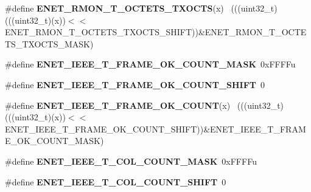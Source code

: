 \begin{DoxyCompactItemize}
\item 
\hypertarget{group___e_n_e_t___register___masks_gac9fe5f21261a51adbd083e6bd430f3d9}{}\#define {\bfseries E\+N\+E\+T\+\_\+\+R\+M\+O\+N\+\_\+\+T\+\_\+\+O\+C\+T\+E\+T\+S\+\_\+\+T\+X\+O\+C\+T\+S}(x)                      ~(((uint32\+\_\+t)(((uint32\+\_\+t)(x))$<$$<$E\+N\+E\+T\+\_\+\+R\+M\+O\+N\+\_\+\+T\+\_\+\+O\+C\+T\+E\+T\+S\+\_\+\+T\+X\+O\+C\+T\+S\+\_\+\+S\+H\+I\+F\+T))\&E\+N\+E\+T\+\_\+\+R\+M\+O\+N\+\_\+\+T\+\_\+\+O\+C\+T\+E\+T\+S\+\_\+\+T\+X\+O\+C\+T\+S\+\_\+\+M\+A\+S\+K)\label{group___e_n_e_t___register___masks_gac9fe5f21261a51adbd083e6bd430f3d9}

\item 
\hypertarget{group___e_n_e_t___register___masks_ga23f952e4fec141cb90d9847d74dd50f0}{}\#define {\bfseries E\+N\+E\+T\+\_\+\+I\+E\+E\+E\+\_\+\+T\+\_\+\+F\+R\+A\+M\+E\+\_\+\+O\+K\+\_\+\+C\+O\+U\+N\+T\+\_\+\+M\+A\+S\+K}~0x\+F\+F\+F\+Fu\label{group___e_n_e_t___register___masks_ga23f952e4fec141cb90d9847d74dd50f0}

\item 
\hypertarget{group___e_n_e_t___register___masks_gab12c920d9e9f6383e5981fb59764e3a9}{}\#define {\bfseries E\+N\+E\+T\+\_\+\+I\+E\+E\+E\+\_\+\+T\+\_\+\+F\+R\+A\+M\+E\+\_\+\+O\+K\+\_\+\+C\+O\+U\+N\+T\+\_\+\+S\+H\+I\+F\+T}~0\label{group___e_n_e_t___register___masks_gab12c920d9e9f6383e5981fb59764e3a9}

\item 
\hypertarget{group___e_n_e_t___register___masks_ga207a1819170304f957bb2be99b1571c3}{}\#define {\bfseries E\+N\+E\+T\+\_\+\+I\+E\+E\+E\+\_\+\+T\+\_\+\+F\+R\+A\+M\+E\+\_\+\+O\+K\+\_\+\+C\+O\+U\+N\+T}(x)                    ~(((uint32\+\_\+t)(((uint32\+\_\+t)(x))$<$$<$E\+N\+E\+T\+\_\+\+I\+E\+E\+E\+\_\+\+T\+\_\+\+F\+R\+A\+M\+E\+\_\+\+O\+K\+\_\+\+C\+O\+U\+N\+T\+\_\+\+S\+H\+I\+F\+T))\&E\+N\+E\+T\+\_\+\+I\+E\+E\+E\+\_\+\+T\+\_\+\+F\+R\+A\+M\+E\+\_\+\+O\+K\+\_\+\+C\+O\+U\+N\+T\+\_\+\+M\+A\+S\+K)\label{group___e_n_e_t___register___masks_ga207a1819170304f957bb2be99b1571c3}

\item 
\hypertarget{group___e_n_e_t___register___masks_ga7306aeb15187e2182972050a1dad04f1}{}\#define {\bfseries E\+N\+E\+T\+\_\+\+I\+E\+E\+E\+\_\+\+T\+\_\+C\+O\+L\+\_\+\+C\+O\+U\+N\+T\+\_\+\+M\+A\+S\+K}~0x\+F\+F\+F\+Fu\label{group___e_n_e_t___register___masks_ga7306aeb15187e2182972050a1dad04f1}

\item 
\hypertarget{group___e_n_e_t___register___masks_ga5d76cc219ed04226ca7b8049d9acf2d6}{}\#define {\bfseries E\+N\+E\+T\+\_\+\+I\+E\+E\+E\+\_\+\+T\+\_\+C\+O\+L\+\_\+\+C\+O\+U\+N\+T\+\_\+\+S\+H\+I\+F\+T}~0\label{group___e_n_e_t___register___masks_ga5d76cc219ed04226ca7b8049d9acf2d6}


\end{DoxyCompactItemize}
